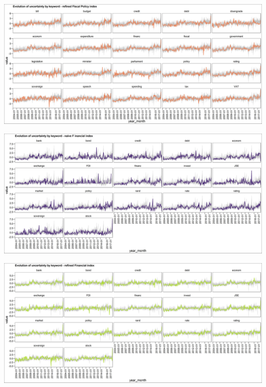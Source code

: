 \documentclass[11pt,preprint, authoryear]{elsarticle}
\let\origfigure\figure
\let\endorigfigure\endfigure
\renewenvironment{figure}[1][2] {
    \expandafter\origfigure\expandafter[H]
} {
    \endorigfigure
}
\numberwithin{equation}{section}
\numberwithin{figure}{section}
\numberwithin{table}{section}
\begin{document}
\begin{figure}
	\centering
	\includegraphics[width=\linewidth, keepaspectratio]{bin/fiscal_key_refine}\\
	
	\caption{Composite Fiscal Policy uncertainty refined index. \label{fig_fis_key_r}}
\end{figure}

\begin{figure}
	\centering
	\includegraphics[width=\linewidth, keepaspectratio]{bin/financial_key_naive}\\
	
	\caption{Composite Financial market uncertainty naive index. \label{fig_fin_key_n}}
\end{figure}

\begin{figure}
	\centering
	\includegraphics[width=\linewidth, keepaspectratio]{bin/financial_key_refine}\\
	
	\caption{Composite Financial market uncertainty refined index. \label{fig_fin_key_r}}
\end{figure}
\end{document}
